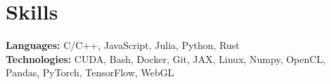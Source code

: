 \section{Skills}
\vspace{2pt}
\resumeSubHeadingListStart
{\item{
                  \textbf{Languages:}{
                        C/C++,
                        JavaScript,
                        Julia,
                        Python,
                        Rust
                  } \\ \vspace{3pt}
                  \textbf{Technologies:}{
                        CUDA,
                        Bash,
                        Docker,
                        Git,
                        JAX,
                        Linux,
                        Numpy,
                        OpenCL,
                        Pandas,
                        PyTorch,
                        TensorFlow,
                        WebGL
                  }
            }}
\resumeSubHeadingListEnd
